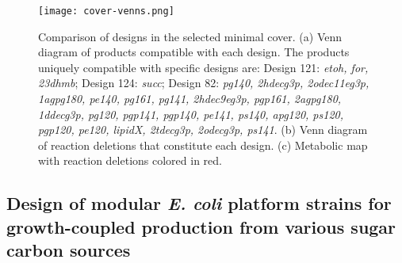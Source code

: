 {\begin{figure}[hp]
    \centering
    \texttt{[image: cover-venns.png]}
    \caption[Comparison of designs in the selected minimal cover]{Comparison of designs in the selected minimal cover. (a) Venn diagram of products compatible with each design. The products uniquely compatible with specific designs are:
       Design 121: \textit{etoh, for, 23dhmb};
       Design 124: \textit{succ};
       Design 82: \textit{pg140, 2hdecg3p, 2odec11eg3p, 1agpg180, pe140, pg161, pg141, 2hdec9eg3p, pgp161, 2agpg180, 1ddecg3p, pg120, pgp141, pgp140, pe141, ps140, apg120, ps120, pgp120, pe120, lipidX, 2tdecg3p, 2odecg3p, ps141}.
    (b) Venn diagram of reaction deletions that constitute each design.
    (c) Metabolic map with reaction deletions colored in red.
       }
    \label{fig7:design-comparison}
\end{figure}



\subsection{Design of modular \textit{E. coli} platform strains for growth-coupled production from various sugar carbon sources} %
}
